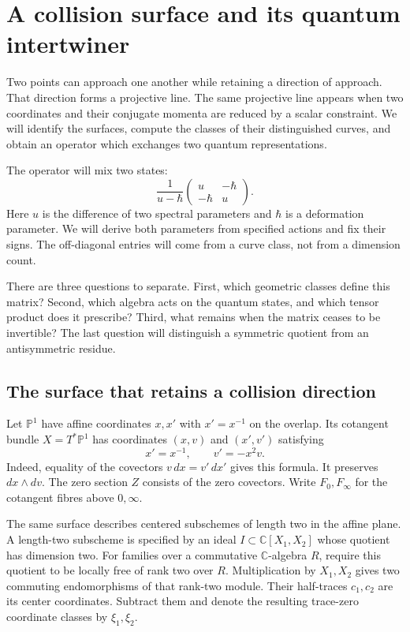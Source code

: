 \chapter{A collision surface and its quantum intertwiner}
\label{chap:gi-collision-intertwiner}

Two points can approach one another while retaining a direction of approach.
That direction forms a projective line.
The same projective line appears when two coordinates and their conjugate momenta are reduced by a scalar constraint.
We will identify the surfaces, compute the classes of their distinguished curves, and obtain an operator which exchanges two quantum representations.

The operator will mix two states:
\[
 \frac1{u-\hbar}
 \begin{pmatrix}u&-\hbar\\-\hbar&u\end{pmatrix}.
\]
Here $u$ is the difference of two spectral parameters and $\hbar$ is a deformation parameter.
We will derive both parameters from specified actions and fix their signs.
The off-diagonal entries will come from a curve class, not from a dimension count.

There are three questions to separate.
First, which geometric classes define this matrix?
Second, which algebra acts on the quantum states, and which tensor product does it prescribe?
Third, what remains when the matrix ceases to be invertible?
The last question will distinguish a symmetric quotient from an antisymmetric residue.

\section{The surface that retains a collision direction}

Let $\mathbb P^1$ have affine coordinates $x,x'$ with $x'=x^{-1}$ on the overlap.
Its cotangent bundle $X=T^*\mathbb P^1$ has coordinates $(x,v)$ and $(x',v')$ satisfying
\begin{equation}\label{eq:gi-cotangent}
 x'=x^{-1},\qquad v'=-x^2v.
\end{equation}
Indeed, equality of the covectors $v\,dx=v'\,dx'$ gives this formula.
It preserves $dx\wedge dv$.
The zero section $Z$ consists of the zero covectors.
Write $F_0,F_\infty$ for the cotangent fibres above $0,\infty$.

The same surface describes centered subschemes of length two in the affine plane.
A length-two subscheme is specified by an ideal $I\subset\mathbb C[X_1,X_2]$ whose quotient has dimension two.
For families over a commutative $\mathbb C$-algebra $R$, require this quotient to be locally free of rank two over $R$.
Multiplication by $X_1,X_2$ gives two commuting endomorphisms of that rank-two module.
Their half-traces $c_1,c_2$ are its center coordinates.
Subtract them and denote the resulting trace-zero coordinate classes by $\xi_1,\xi_2$.

